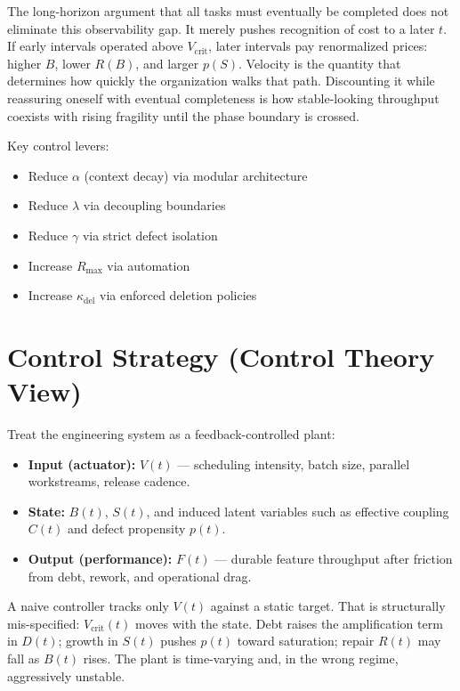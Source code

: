 \documentclass[11pt]{article}
\begin{document}
The long-horizon argument that all tasks must eventually be completed does not eliminate this observability gap. It merely pushes recognition of cost to a later $t$. If early intervals operated above $V_{\text{crit}}$, later intervals pay renormalized prices: higher $B$, lower $R(B)$, and larger $p(S)$. Velocity is the quantity that determines how quickly the organization walks that path. Discounting it while reassuring oneself with eventual completeness is how stable-looking throughput coexists with rising fragility until the phase boundary is crossed.

Key control levers:

\begin{itemize}
    \item Reduce $\alpha$ (context decay) via modular architecture
    \item Reduce $\lambda$ via decoupling boundaries
    \item Reduce $\gamma$ via strict defect isolation
    \item Increase $R_{\max}$ via automation
    \item Increase $\kappa_{\text{del}}$ via enforced deletion policies
\end{itemize}

\section{Control Strategy (Control Theory View)}

Treat the engineering system as a feedback-controlled plant:

\begin{itemize}
    \item \textbf{Input (actuator):} $V(t)$ --- scheduling intensity, batch size, parallel workstreams, release cadence.
    \item \textbf{State:} $B(t)$, $S(t)$, and induced latent variables such as effective coupling $C(t)$ and defect propensity $p(t)$.
    \item \textbf{Output (performance):} $F(t)$ --- durable feature throughput after friction from debt, rework, and operational drag.
\end{itemize}

A naive controller tracks only $V(t)$ against a static target. That is structurally mis-specified: $V_{\text{crit}}(t)$ moves with the state. Debt raises the amplification term in $D(t)$; growth in $S(t)$ pushes $p(t)$ toward saturation; repair $R(t)$ may fall as $B(t)$ rises. The plant is time-varying and, in the wrong regime, aggressively unstable.
\end{document}
